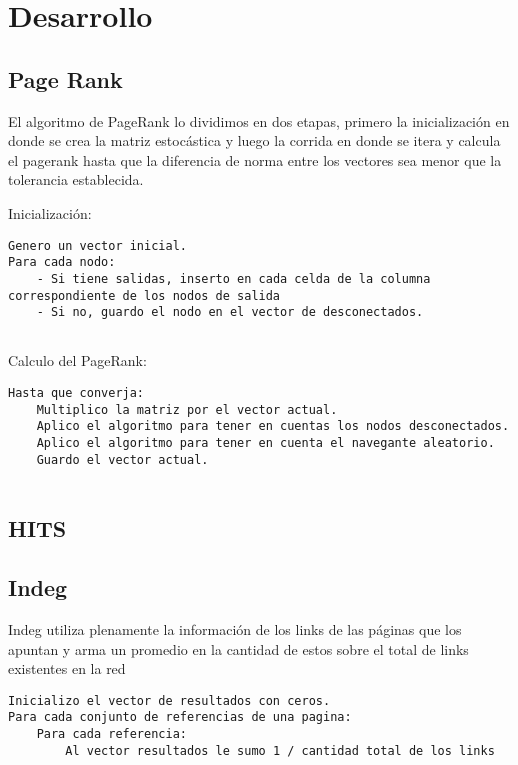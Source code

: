 \section{Desarrollo}

\subsection{Page Rank}
El algoritmo de PageRank lo dividimos en dos etapas, primero la inicializaci\'on en donde se crea la matriz estoc\'astica y luego la corrida en donde se itera y calcula el pagerank hasta que la diferencia de norma entre los vectores sea menor que la tolerancia establecida.

Inicializaci\'on:
\begin{lstlisting}[frame=single]  
Genero un vector inicial.
Para cada nodo:
	- Si tiene salidas, inserto en cada celda de la columna correspondiente de los nodos de salida
	- Si no, guardo el nodo en el vector de desconectados.
	
\end{lstlisting}

Calculo del PageRank:
\begin{lstlisting}[frame=single] 
Hasta que converja:
	Multiplico la matriz por el vector actual.
	Aplico el algoritmo para tener en cuentas los nodos desconectados.
	Aplico el algoritmo para tener en cuenta el navegante aleatorio.
	Guardo el vector actual.
	
\end{lstlisting}


\subsection{HITS}

\subsection{Indeg}

Indeg utiliza plenamente la información de los links de las páginas que los apuntan y arma un promedio en la cantidad de estos sobre el total de links existentes en la red

\begin{lstlisting}[frame=single] 
Inicializo el vector de resultados con ceros.
Para cada conjunto de referencias de una pagina:
	Para cada referencia:
		Al vector resultados le sumo 1 / cantidad total de los links
	
\end{lstlisting}